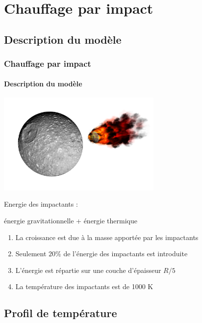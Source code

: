 \documentclass{beamer}
\begin{document}
\section{Chauffage par impact}
\subsection{Description du modèle}

\begin{frame}
	\frametitle{Chauffage par impact}
	\framesubtitle{Description du modèle}
	
\vspace{-0.3cm}
\center \includegraphics[height = 5cm]{figures/impact.pdf}  

\vspace{-0.5cm}
Energie des impactants : 

énergie gravitationnelle + énergie thermique
\vspace{0.3cm}

\begin{enumerate}
\item La croissance est due à la masse apportée par les impactants
\item Seulement $20\%$ de l'énergie des impactants est introduite
\item L'énergie est répartie sur une couche d'épaisseur $R/5$
\item La température des impactants est de 1000 K 
\end{enumerate}
\end{frame}

\subsection{Profil de température}
\end{document}
